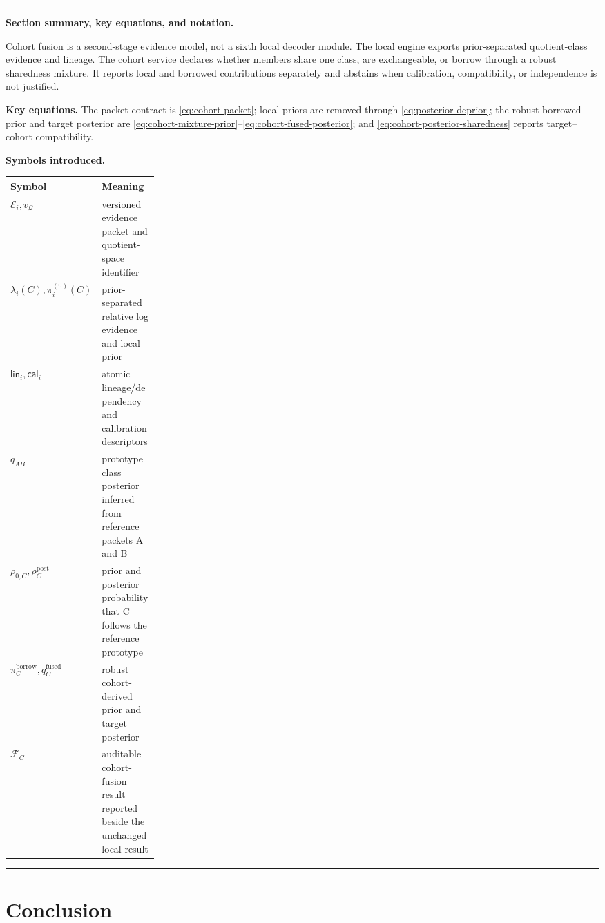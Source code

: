 \documentclass[11pt]{article}
\newenvironment{sectionrecap}
{\par\medskip\begingroup\small\noindent\rule{\linewidth}{0.4pt}\par
\smallskip\noindent\textbf{Section summary, key equations, and notation.}\par\smallskip}
{\par\smallskip\noindent\rule{\linewidth}{0.4pt}\par\endgroup\medskip}
\begin{document}
    \begin{sectionrecap}
        Cohort fusion is a second-stage evidence model, not a sixth local decoder module. The
        local engine exports prior-separated quotient-class evidence and lineage. The cohort
        service declares whether members share one class, are exchangeable, or borrow through a
        robust sharedness mixture. It reports local and borrowed contributions separately and
        abstains when calibration, compatibility, or independence is not justified.

        \noindent\textbf{Key equations.}
        The packet contract is \eqref{eq:cohort-packet}; local priors are removed through
        \eqref{eq:posterior-deprior}; the robust borrowed prior and target posterior are
        \eqref{eq:cohort-mixture-prior}--\eqref{eq:cohort-fused-posterior}; and
        \eqref{eq:cohort-posterior-sharedness} reports target--cohort compatibility.

        \noindent\textbf{Symbols introduced.}
        \begin{center}
            \small
            \begin{tabularx}{0.97\linewidth}{@{}p{0.25\linewidth}Y@{}}
\toprule
Symbol & Meaning \\
\midrule
$\mathcal E_i,v_{\mathcal Q}$ & versioned evidence packet and quotient-space identifier \\
$\lambda_i(C),\pi_i^{(0)}(C)$ & prior-separated relative log evidence and local prior \\
$\mathsf{lin}_i,\mathsf{cal}_i$ & atomic lineage/dependency and calibration descriptors \\
$q_{AB}$ & prototype class posterior inferred from reference packets A and B \\
$\rho_{0,C},\rho_C^{\mathrm{post}}$ & prior and posterior probability that C follows the reference prototype \\
$\pi_C^{\mathrm{borrow}},q_C^{\mathrm{fused}}$ & robust cohort-derived prior and target posterior \\
$\mathcal F_C$ & auditable cohort-fusion result reported beside the unchanged local result \\
\bottomrule
            \end{tabularx}
        \end{center}
    \end{sectionrecap}


    \section{Conclusion}\label{sec:conclusion}
\end{document}
